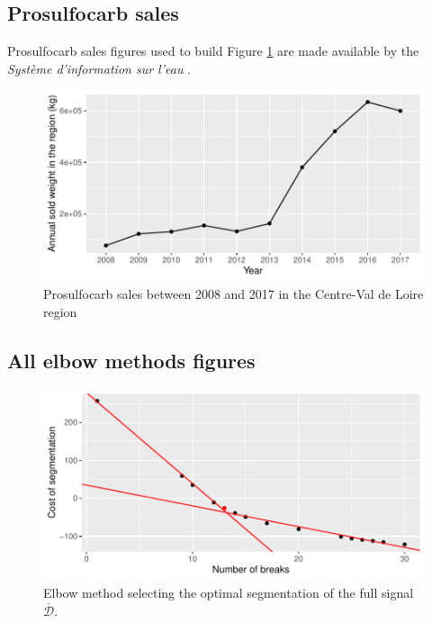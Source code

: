 \begin{appendices}
\subsection{Prosulfocarb sales}\label{section:sale}

Prosulfocarb sales figures used to build Figure \ref{fig:sale} are made available by the \emph{Système d'information sur l'eau} \cite{BNVD}.

\begin{figure}[H]
  \centering
  \includegraphics[]{figs/App/Sales_pro.pdf}
  \caption{Prosulfocarb sales between 2008 and 2017 in the Centre-Val de Loire region}
  \label{fig:sale}
\end{figure}

\subsection{All elbow methods figures}\label{section:elb}

\begin{figure}[H]
  \centering
  \includegraphics[]{figs/App/Elbow_seg.pdf}
  \caption{Elbow method selecting the optimal segmentation of the full signal $\overline{\mathcal{D}}$.}
  \label{fig:elb_seg}
\end{figure}


\end{appendices}
